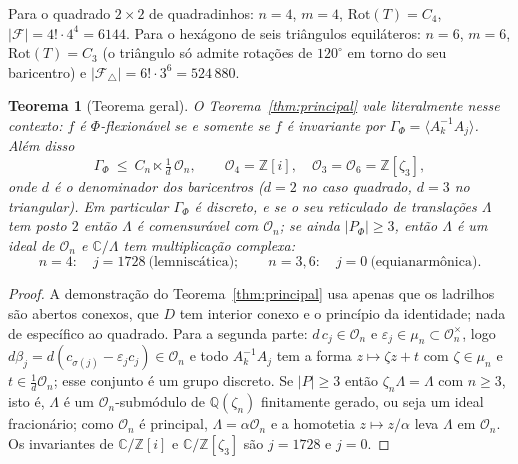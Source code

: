 \documentclass[11pt,a4paper]{article}
\theoremstyle{plain}
\newtheorem{teorema}{Teorema}[section]
\theoremstyle{definition}
\theoremstyle{remark}
\newcommand{\C}{\mathbb{C}}
\newcommand{\Z}{\mathbb{Z}}
\newcommand{\Q}{\mathbb{Q}}
\newcommand{\Zi}{\Z[i]}
\newcommand{\FF}{\mathscr{F}}
\begin{document}
Para o quadrado $2\times2$ de quadradinhos: $n=4$, $m=4$,
$\mathrm{Rot}(T)=C_4$, $|\FF|=4!\cdot4^4=6144$. Para o hexágono de seis
triângulos equiláteros: $n=6$, $m=6$, $\mathrm{Rot}(T)=C_3$ (o triângulo só
admite rotações de $120^\circ$ em torno do seu baricentro) e
$|\FF_\triangle|=6!\cdot3^6=524\,880$.

\begin{teorema}[Teorema geral]\label{thm:geral}
O Teorema~\ref{thm:principal} vale literalmente nesse contexto: $f$ é
$\Phi$-flexionável se e somente se $f$ é invariante por
$\Gamma_\Phi=\langle A_k^{-1}A_j\rangle$. Além disso
\[
\Gamma_\Phi\ \le\ C_n\ltimes\tfrac1d\,\mathcal O_n,\qquad
\mathcal O_4=\Zi,\quad \mathcal O_3=\mathcal O_6=\Z[\zeta_3],
\]
onde $d$ é o denominador dos baricentros ($d=2$ no caso quadrado, $d=3$ no
triangular). Em particular $\Gamma_\Phi$ é discreto, e se o seu reticulado de
translações $\Lambda$ tem posto $2$ então $\Lambda$ é comensurável com
$\mathcal O_n$; se ainda $|P_\Phi|\ge3$, então $\Lambda$ é um ideal de
$\mathcal O_n$ e $\C/\Lambda$ tem multiplicação complexa:
\[
n=4:\quad j=1728 \ \text{(lemniscática)};\qquad
n=3,6:\quad j=0 \ \text{(equianarmônica)}.
\]
\end{teorema}

\begin{proof}
A demonstração do Teorema~\ref{thm:principal} usa apenas que os ladrilhos são
abertos conexos, que $D$ tem interior conexo e o princípio da identidade;
nada de específico ao quadrado. Para a segunda parte: $d\,c_j\in\mathcal O_n$ e
$\varepsilon_j\in\mu_n\subset\mathcal O_n^\times$, logo
$d\beta_j=d(c_{\sigma(j)}-\varepsilon_jc_j)\in\mathcal O_n$ e todo
$A_k^{-1}A_j$ tem a forma $z\mapsto\zeta z+t$ com $\zeta\in\mu_n$ e
$t\in\frac1d\mathcal O_n$; esse conjunto é um grupo discreto. Se $|P|\ge3$
então $\zeta_n\Lambda=\Lambda$ com $n\ge3$, isto é, $\Lambda$ é um
$\mathcal O_n$-submódulo de $\Q(\zeta_n)$ finitamente gerado, ou seja um ideal
fracionário; como $\mathcal O_n$ é principal, $\Lambda=\alpha\mathcal O_n$ e a
homotetia $z\mapsto z/\alpha$ leva $\Lambda$ em $\mathcal O_n$. Os invariantes
de $\C/\Zi$ e $\C/\Z[\zeta_3]$ são $j=1728$ e $j=0$.
\end{proof}
\end{document}
